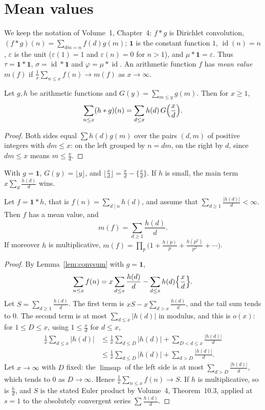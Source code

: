 \section{Mean values}

We keep the notation of Volume~1, Chapter~4: $f*g$ is Dirichlet convolution, $(f*g)(n)=\sum_{dm=n}f(d)g(m)$; $\mathbf1$ is the constant
function $1$, $\operatorname{id}(n)=n$, $\varepsilon$ is the unit ($\varepsilon(1)=1$ and $\varepsilon(n)=0$ for $n>1$), and $\mu*\mathbf1=\varepsilon$. Thus
$\tau=\mathbf1*\mathbf1$, $\sigma=\operatorname{id}*\mathbf1$ and $\varphi=\mu*\operatorname{id}$. An arithmetic function $f$ has \emph{mean value} $m(f)$ if
$\frac1x\sum_{n\le x}f(n)\to m(f)$ as $x\to\infty$.

\begin{lemma}\label{lem:convsum}
Let $g,h$ be arithmetic functions and $G(y)=\sum_{m\le y}g(m)$. Then for $x\ge1$,
\[
\sum_{n\le x}(h*g)(n)=\sum_{d\le x}h(d)\,G\Bigl(\frac xd\Bigr).
\]
\end{lemma}
\begin{proof}
Both sides equal $\sum h(d)g(m)$ over the pairs $(d,m)$ of positive integers with $dm\le x$: on the left grouped by $n=dm$, on the right
by $d$, since $dm\le x$ means $m\le\frac xd$.
\end{proof}

With $g=\mathbf1$, $G(y)=\lfloor y\rfloor$, and $\lfloor\frac xd\rfloor=\frac xd-\{\frac xd\}$. If $h$ is small, the main term $x\sum_d\frac{h(d)}d$ wins.

\begin{theorem}[Wintner, 1943]\label{thm:wintner}
Let $f=\mathbf1*h$, that is $f(n)=\sum_{d\mid n}h(d)$, and assume that $\sum_{d\ge1}\frac{|h(d)|}d<\infty$. Then $f$ has a mean value, and
\[
m(f)=\sum_{d\ge1}\frac{h(d)}d.
\]
If moreover $h$ is multiplicative, $m(f)=\prod_p\bigl(1+\frac{h(p)}p+\frac{h(p^2)}{p^2}+\cdots\bigr)$.
\end{theorem}
\begin{proof}
By Lemma~\ref{lem:convsum} with $g=\mathbf1$,
\[
\sum_{n\le x}f(n)=x\sum_{d\le x}\frac{h(d)}d-\sum_{d\le x}h(d)\Bigl\{\frac xd\Bigr\}.
\]
Let $S=\sum_{d\ge1}\frac{h(d)}d$. The first term is $xS-x\sum_{d>x}\frac{h(d)}d$, and the tail sum tends to $0$. The second term is at most
$\sum_{d\le x}|h(d)|$ in modulus, and this is $o(x)$: for $1\le D\le x$, using $1\le\frac xd$ for $d\le x$,
\[
\begin{aligned}\frac1x\sum_{d\le x}|h(d)|&\le\frac1x\sum_{d\le D}|h(d)|+\sum_{D<d\le x}\frac{|h(d)|}d\\&\le\frac1x\sum_{d\le D}|h(d)|+\sum_{d>D}\frac{|h(d)|}d.\end{aligned}
\]
Let $x\to\infty$ with $D$ fixed: the $\limsup$ of the left side is at most $\sum_{d>D}\frac{|h(d)|}d$, which tends to $0$ as $D\to\infty$. Hence
$\frac1x\sum_{n\le x}f(n)\to S$. If $h$ is multiplicative, so is $\frac hd$, and $S$ is the stated Euler product by Volume~4, Theorem~10.3, applied at
$s=1$ to the absolutely convergent series $\sum\frac{h(d)}d$.
\end{proof}

